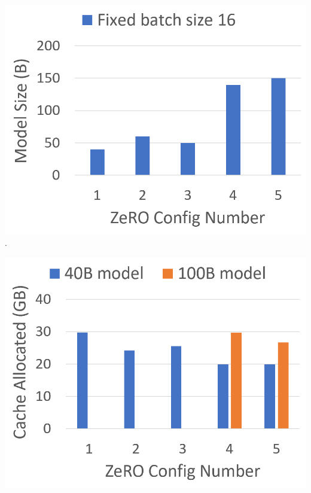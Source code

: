 \begin{table}
\centering
   \begin{minipage}[b]{0.30\columnwidth}
       \includegraphics[width=\textwidth]{max_model_size.PNG}
        . \label{fig:max-model-size}
   \end{minipage}    
   \quad
   \begin{minipage}[b]{0.30\columnwidth}
       \includegraphics[width=\textwidth]{cache_allocated.PNG}
        \label{fig:max-cached-memory}
   \end{minipage}    
   \quad
   \begin{minipage}[b]{0.30\columnwidth}

\end{minipage}
\end{table}
